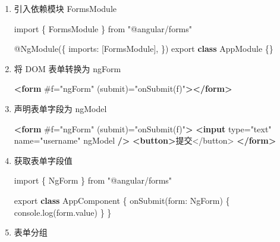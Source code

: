 \documentclass[
]{article}
\newenvironment{Shaded}{}{}
\newcommand{\AttributeTok}[1]{\textcolor[rgb]{0.49,0.56,0.16}{#1}}
\newcommand{\BuiltInTok}[1]{#1}
\newcommand{\DataTypeTok}[1]{\textcolor[rgb]{0.56,0.13,0.00}{#1}}
\newcommand{\FunctionTok}[1]{\textcolor[rgb]{0.02,0.16,0.49}{#1}}
\newcommand{\ImportTok}[1]{#1}
\newcommand{\KeywordTok}[1]{\textcolor[rgb]{0.00,0.44,0.13}{\textbf{#1}}}
\newcommand{\NormalTok}[1]{#1}
\newcommand{\OperatorTok}[1]{\textcolor[rgb]{0.40,0.40,0.40}{#1}}
\newcommand{\OtherTok}[1]{\textcolor[rgb]{0.00,0.44,0.13}{#1}}
\newcommand{\StringTok}[1]{\textcolor[rgb]{0.25,0.44,0.63}{#1}}
\begin{document}
\begin{enumerate}
\def\labelenumi{\arabic{enumi}.}
\item
  引入依赖模块 FormsModule

\begin{Shaded}
\begin{Highlighting}[]
\ImportTok{import}\NormalTok{ \{ FormsModule \} }\ImportTok{from} \StringTok{"@angular/forms"}

\NormalTok{@}\FunctionTok{NgModule}\NormalTok{(\{}
  \DataTypeTok{imports}\OperatorTok{:}\NormalTok{ [FormsModule]}\OperatorTok{,}
\NormalTok{\})}
\ImportTok{export} \KeywordTok{class}\NormalTok{ AppModule \{\}}
\end{Highlighting}
\end{Shaded}
\item
  将 DOM 表单转换为 ngForm

\begin{Shaded}
\begin{Highlighting}[]
\KeywordTok{\textless{}form}\OtherTok{ \#f=}\StringTok{"ngForm"}\OtherTok{ (submit)=}\StringTok{"onSubmit(f)"}\KeywordTok{\textgreater{}\textless{}/form\textgreater{}}
\end{Highlighting}
\end{Shaded}
\item
  声明表单字段为 ngModel

\begin{Shaded}
\begin{Highlighting}[]
\KeywordTok{\textless{}form}\OtherTok{ \#f=}\StringTok{"ngForm"}\OtherTok{ (submit)=}\StringTok{"onSubmit(f)"}\KeywordTok{\textgreater{}}
  \KeywordTok{\textless{}input}\OtherTok{ type=}\StringTok{"text"}\OtherTok{ name=}\StringTok{"username"}\OtherTok{ ngModel} \KeywordTok{/\textgreater{}}
  \KeywordTok{\textless{}button\textgreater{}}\NormalTok{提交\textless{}/button\textgreater{}}
\KeywordTok{\textless{}/form\textgreater{}}
\end{Highlighting}
\end{Shaded}
\item
  获取表单字段值

\begin{Shaded}
\begin{Highlighting}[]
\ImportTok{import}\NormalTok{ \{ NgForm \} }\ImportTok{from} \StringTok{"@angular/forms"}

\ImportTok{export} \KeywordTok{class}\NormalTok{ AppComponent \{}
  \FunctionTok{onSubmit}\NormalTok{(}\DataTypeTok{form}\OperatorTok{:}\NormalTok{ NgForm) \{}
    \BuiltInTok{console}\OperatorTok{.}\FunctionTok{log}\NormalTok{(form}\OperatorTok{.}\AttributeTok{value}\NormalTok{)}
\NormalTok{  \}}
\NormalTok{\}}
\end{Highlighting}
\end{Shaded}
\item
  表单分组


\end{enumerate}
\end{document}
